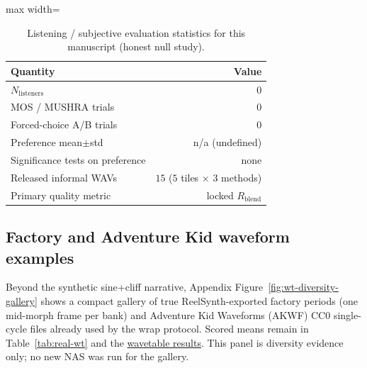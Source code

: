 \begin{table}[t]
  \centering
  \caption{Listening / subjective evaluation statistics for this manuscript (honest null study).}
  \label{tab:listening-stats}
  \setlength{\tabcolsep}{6pt}
  \begin{adjustbox}{max width=\columnwidth}
\begin{tabular}{@{}lr@{}}
    \toprule
    Quantity & Value \\
    \midrule
    $N_{\mathrm{listeners}}$ & $0$ \\
    MOS / MUSHRA trials & $0$ \\
    Forced-choice A/B trials & $0$ \\
    Preference mean$\pm$std & n/a (undefined) \\
    Significance tests on preference & none \\
    Released informal WAVs & $15$ ($5$ tiles $\times$ $3$ methods) \\
    Primary quality metric & locked $R_{\mathrm{blend}}$ \\
    \bottomrule
  \end{tabular}
\end{adjustbox}
\end{table}

\subsection{Factory and Adventure Kid waveform examples}
\label{sec:wt-gallery}

Beyond the synthetic sine{+}cliff narrative, Appendix Figure~\ref{fig:wt-diversity-gallery} shows a compact gallery of true ReelSynth-exported factory periods (one mid-morph frame per bank) and Adventure Kid Waveforms (AKWF) CC0 single-cycle files already used by the wrap protocol.
Scored means remain in Table~\ref{tab:real-wt} and the \href{https://github.com/reeldemo/denoise-opt-meta/blob/master/paper/Unsupervised_Wrap-Discontinuity_Repair_in_Wavetable_Synthesis_via_Hybrid_GA-PPO_Meta-Search_v12/figures/real_wt_matrix.json}{wavetable results}.
This panel is diversity evidence only; no new NAS was run for the gallery.
